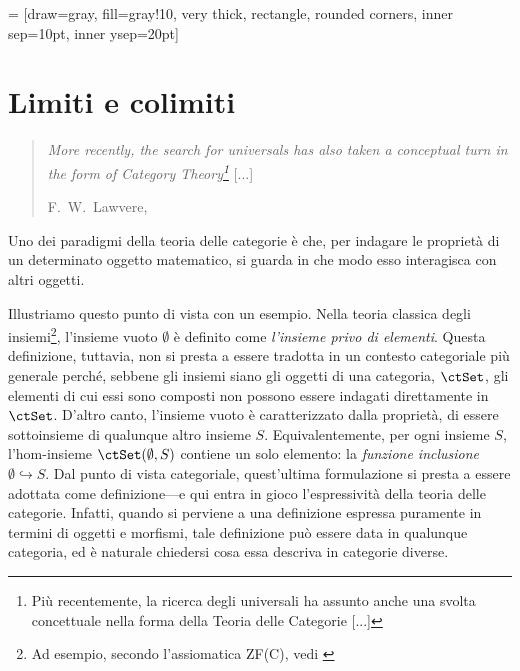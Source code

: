  = [draw=gray, fill=gray!10, very thick,
    rectangle, rounded corners, inner sep=10pt, inner ysep=20pt]
\chapter{Limiti e colimiti}\label{chap_limiti_colimiti}
\begin{quotation}
\emph{
	More recently, the search for universals has also taken a conceptual turn in the form of Category Theory\footnote{Più recentemente, la ricerca degli universali ha assunto anche una svolta concettuale nella forma della Teoria delle Categorie [...]}} [...]
	
	\hfill F.\ W.\ Lawvere, \cite{lawvere1969adjointness}
\end{quotation}




Uno dei paradigmi della teoria delle categorie è che, per indagare le proprietà di un determinato oggetto matematico, si guarda in che modo esso interagisca con  altri oggetti.

Illustriamo questo punto di vista con un esempio. Nella teoria classica degli insiemi\footnote{Ad esempio, secondo l'assiomatica ZF(C), vedi \cite{ZFC}}, l'insieme vuoto \(\emptyset\) è definito come \emph{l'insieme privo di elementi}. Questa definizione, tuttavia, non si presta a essere tradotta in un contesto categoriale più generale perché, sebbene gli insiemi siano gli oggetti di una categoria, \(\ctSet\), gli elementi di cui essi sono composti non possono essere indagati direttamente in \(\ctSet\). D'altro canto, l'insieme vuoto è caratterizzato dalla  proprietà, di essere sottoinsieme di qualunque altro insieme \(S\). Equivalentemente, per ogni insieme \(S\), l'hom-insieme \(\Hom\ctSet(\emptyset,S)\) contiene un solo elemento: la  \emph{funzione inclusione}  \(\emptyset \hookrightarrow S\). Dal punto di vista categoriale, quest'ultima formulazione si presta a essere adottata come definizione---e qui entra in gioco l'espressività della teoria delle categorie. Infatti, quando si perviene a una definizione espressa puramente in termini di oggetti e morfismi,  tale definizione può essere data in qualunque categoria, ed è naturale chiedersi cosa essa descriva in categorie diverse. 


